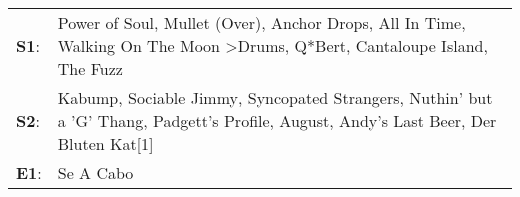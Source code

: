 \begin{supertabular}{p{0.03\textwidth}p{0.92\textwidth}}
 \textbf{S1}:  &  Power of Soul\textsuperscript{}, \enspace Mullet (Over)\textsuperscript{}, \enspace Anchor Drops\textsuperscript{}, \enspace All In Time\textsuperscript{}, \enspace Walking On The Moon\textsuperscript{} \textgreater \enspace Drums\textsuperscript{}, \enspace Q*Bert\textsuperscript{}, \enspace Cantaloupe Island\textsuperscript{}, \enspace The Fuzz\textsuperscript{}  \enspace  \\
 \textbf{S2}:  &                            Kabump\textsuperscript{}, \enspace Sociable Jimmy\textsuperscript{}, \enspace Syncopated Strangers\textsuperscript{}, \enspace Nuthin' but a 'G' Thang\textsuperscript{}, \enspace Padgett's Profile\textsuperscript{}, \enspace August\textsuperscript{}, \enspace Andy's Last Beer\textsuperscript{}, \enspace Der Bluten Kat[1]\textsuperscript{}  \enspace  \\
 \textbf{E1}:  &                                                                                                                                                                                                                                                                                                                                                     Se A Cabo\textsuperscript{}  \enspace  \\
\end{supertabular}
